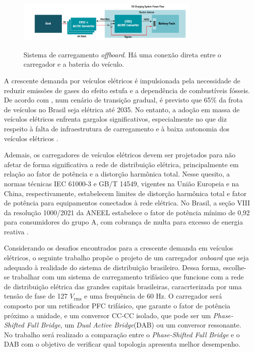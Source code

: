 \begin{figure}[htb]
    \centering
    \caption{Sistema de carregamento \textit{offboard}. Há uma conexão direta entre o
        carregador e a bateria do veículo.}
    \includegraphics[width=0.8\textwidth]{figuras/diagrama_bypass.png}
    \label{fig:diagrama-bypass-offboard}

\end{figure}

A crescente demanda por veículos elétricos é impulsionada pela necessidade de reduzir emissões
de gases do efeito estufa e a dependência de combustíveis fósseis. De acordo com
\cite{anfavea2024descarbonizacao}, num cenário de transição gradual, é previsto que 65\% da
frota de veículos no Brasil seja elétrica até 2035. No entanto, a adoção em massa de veículos
elétricos enfrenta gargalos significativos, especialmente no que diz respeito à falta de
infraestrutura de carregamento e à baixa autonomia dos veículos elétricos \cite{Karneddi:2021}.

Ademais, os carregadores de veículos elétricos devem ser projetados para não afetar de forma
significativa a rede de distribuição elétrica, principalmente em relação ao fator de potência e
a distorção harmônica total. Nesse quesito, a normas técnicas IEC 61000-3 e GB/T 14549,
vigentes na União Europeia e na China, respectivamente, estabelecem limites de distorção
harmônica total e fator de potência para equipamentos conectados à rede elétrica. No Brasil, a
seção VIII da resolução 1000/2021 da ANEEL estabelece o fator de potência mínimo de 0,92 para
consumidores do grupo A, com cobrança de multa para excesso de energia reativa
\cite{aneel_ren1000_2021}.

Considerando os desafios encontrados para a crescente demanda em veículos elétricos, o seguinte
trabalho propõe o projeto de um carregador \textit{onboard} que seja adequado à realidade do
sistema de distribuição brasileiro. Dessa forma, escolhe-se trabalhar com um sistema de
carregamento trifásico que funcione com a rede de distribuição elétrica das grandes capitais
brasileiras, caracrterizada por uma tensão de fase de 127 \(V_{\mathrm{rms}}\) e uma frequência
de 60 Hz. O carregador será composto por um retificador PFC trifásico, que garante o fator de
potência próximo a unidade, e um conversor CC-CC isolado, que pode ser um \textit{Phase-Shifted
    Full Bridge}, um \textit{Dual Active Bridge}(DAB) ou um conversor ressonante. No trabalho será
realizado a comparação entre o \textit{Phase-Shifted Full Bridge} e o DAB com o objetivo de
verificar qual topologia apresenta melhor desempenho.

